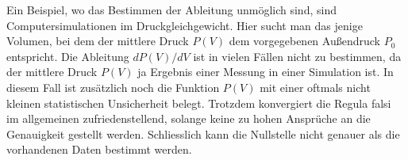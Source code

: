 Ein Beispiel, wo das Bestimmen der Ableitung unmöglich sind, sind
Computersimulationen im Druckgleichgewicht. Hier sucht man das jenige
Volumen, bei dem der mittlere Druck $P(V)$ dem vorgegebenen Außendruck
$P_0$ entspricht. Die Ableitung $dP(V)/dV$ ist in vielen Fällen nicht
zu bestimmen, da der mittlere Druck $P(V)$ ja Ergebnis einer Messung
in einer Simulation ist. In diesem Fall ist zusätzlich noch die
Funktion $P(V)$ mit einer oftmals nicht kleinen statistischen
Unsicherheit belegt. Trotzdem konvergiert die Regula falsi im
allgemeinen zufriedenstellend, solange keine zu hohen Ansprüche an die
Genauigkeit gestellt werden. Schliesslich kann die Nullstelle nicht
genauer als die vorhandenen Daten bestimmt werden.






